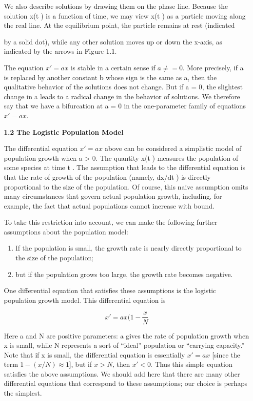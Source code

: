 \documentclass[12pt]{article}
\begin{document}
We also describe solutions by drawing them on the phase line. Because the
solution x(t ) is a function of time, we may view x(t ) as a particle moving along
the real line. At the equilibrium point, the particle remains at rest (indicated

by a solid dot), while any other solution moves up or down the x-axis, as
indicated by the arrows in Figure 1.1.

The equation $x'= ax$ is stable in a certain sense if $a \neq = 0$. More precisely,
if a is replaced by another constant b whose sign is the same as a, then the
qualitative behavior of the solutions does not change. But if a = 0, the slightest
change in a leads to a radical change in the behavior of solutions. We therefore
say that we have a bifurcation at a = 0 in the one-parameter family of equations
$x' = ax$.

\textbf{1.2 The Logistic Population Model}

\hfill

The differential equation $x'= ax$ above can be considered a simplistic model
of population growth when a > 0. The quantity x(t ) measures the population
of some species at time t . The assumption that leads to the differential equation
is that the rate of growth of the population (namely, dx/dt ) is directly
proportional to the size of the population. Of course, this naive assumption
omits many circumstances that govern actual population growth, including,
for example, the fact that actual populations cannot increase with bound.

To take this restriction into account, we can make the following further
assumptions about the population model:

\begin{enumerate}
\item If the population is small, the growth rate is nearly directly proportional
to the size of the population;
\item but if the population grows too large, the growth rate becomes negative.
\end{enumerate}

One differential equation that satisfies these assumptions is the logistic
population growth model. This differential equation is

\[
x' = ax (1 - \frac{x}{N}
\]

Here a and N are positive parameters: a gives the rate of population growth
when x is small, while N represents a sort of “ideal” population or “carrying
capacity.” Note that if x is small, the differential equation is essentially $x' = ax$
[since the term $1-(x/N) \approx 1$], but if $x > N$, then $x'< 0$. Thus this simple
equation satisfies the above assumptions. We should add here that there are
many other differential equations that correspond to these assumptions; our
choice is perhaps the simplest.
\end{document}
